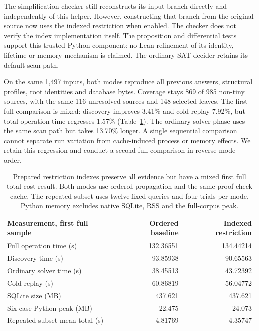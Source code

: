 \documentclass[11pt,a4paper]{article}
\numberwithin{equation}{section}
\theoremstyle{plain}
\theoremstyle{definition}
\theoremstyle{remark}
\begin{document}
The simplification checker still reconstructs its input branch directly and independently of this helper. However, constructing that branch from the original source now uses the indexed restriction when enabled. The checker does not verify the index implementation itself. The proposition and differential tests support this trusted Python component; no Lean refinement of its identity, lifetime or memory mechanism is claimed. The ordinary SAT decider retains its default scan path.

On the same 1,497 inputs, both modes reproduce all previous answers, structural profiles, root identities and database bytes. Coverage stays 869 of 985 non-tiny sources, with the same 116 unresolved sources and 148 selected leaves. The first full comparison is mixed: discovery improves 3.41\% and cold replay 7.92\%, but total operation time regresses 1.57\% (Table~\ref{tab:indexed-restriction}). The ordinary solver phase uses the same scan path but takes 13.70\% longer. A single sequential comparison cannot separate run variation from cache-induced process or memory effects. We retain this regression and conduct a second full comparison in reverse mode order.

\begin{table}[t]
\centering
\small
\begin{tabular}{lrr}
\toprule
Measurement, first full sample & Ordered baseline & Indexed restriction \\
\midrule
Full operation time (s) & 132.36551 & 134.44214 \\
Discovery time (s) & 93.85938 & 90.65563 \\
Ordinary solver time (s) & 38.45513 & 43.72392 \\
Cold replay (s) & 60.86819 & 56.04772 \\
SQLite size (MB) & 437.621 & 437.621 \\
Six-case Python peak (MB) & 22.475 & 24.073 \\
Repeated subset mean total (s) & 4.81769 & 4.35747 \\
\bottomrule
\end{tabular}
\caption{Prepared restriction indexes preserve all evidence but have a mixed first full total-cost result. Both modes use ordered propagation and the same proof-check cache. The repeated subset uses twelve fixed queries and four trials per mode. Python memory excludes native SQLite, RSS and the full-corpus peak.}
\label{tab:indexed-restriction}
\end{table}
\end{document}
